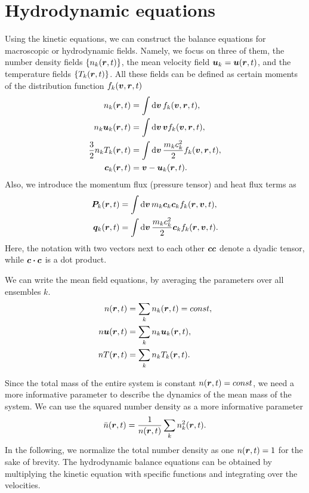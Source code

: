 \documentclass[aps,prl,preprint,groupedaddress,10pt]{revtex4-2}
\begin{document}
\section{Hydrodynamic equations}
Using the kinetic equations, we can construct the balance equations for macroscopic or
hydrodynamic fields. Namely, we focus on three of them, the number density fields
$\Bqty{n_k\pqty{\br,t}}$, the mean velocity field $\bu_k=\bu\pqty{\br,t}$, and the temperature
fields $\Bqty{T_k\pqty{\br,t}}$. All these fields can be defined as certain moments of the
distribution function $f_k\pqty{\bv, \br,t}$
\begin{equation}
    \begin{split}
        n_k\pqty{\br,t} &= \int\dd{\bv} f_k\pqty{\bv,\br,t},\\
        n_k\bu_k\pqty{\br,t} &= \int\dd{\bv} \bv f_k\pqty{\bv,\br,t},\\
        \frac{3}{2}n_kT_k\pqty{\br,t} &= \int\dd{\bv}\frac{m_kc_k^2}{2}f_k\pqty{\bv,\br,t},\\
        \bc_k\pqty{\br,t} &= \bv - \bu_k\pqty{\br,t}.
    \end{split}
\end{equation}
Also, we introduce the momentum flux (pressure tensor) and heat flux terms as
\begin{equation}
    \begin{split}
        \bP_k\pqty{\br,t} &= \int\dd{\bv}m_k\bc_k\bc_kf_k\pqty{\br,\bv,t},\\
        \bq_k\pqty{\br,t} &= \int\dd{\bv}\frac{m_kc_k^2}{2}\bc_kf_k\pqty{\br,\bv,t}.
    \end{split}
\end{equation}
Here, the notation with two vectors next to each other $\vb*{c}\vb*{c}$ denote a dyadic tensor, while
$\bc\vdot\bc$ is a dot product.

We can write the mean field equations, by averaging the parameters over all ensembles $k$.
\begin{equation}
    \begin{split}
        n\pqty{\br,t} &= \sum_kn_k\pqty{\br,t}=const,\\
        n\bu\pqty{\br,t} &= \sum_kn_k\bu_k\pqty{\br,t},\\
        nT\pqty{\br,t} &= \sum_kn_kT_k\pqty{\br,t}.
    \end{split}
\end{equation}

Since the total mass of the entire system is constant $n\pqty{\br,t}=const$, we need a more
informative parameter to describe the dynamics of the mean mass of the system. We can use the
squared number density as a more informative parameter
\begin{equation}
    \bar{n}\pqty{\br,t}=\frac{1}{n\pqty{\br,t}}\sum_kn_k^2\pqty{\br,t}.
\end{equation}
In the following, we normalize the total number density as one $n\pqty{\br,t}=1$ for the sake
of brevity. The hydrodynamic balance equations can be obtained by multiplying the kinetic
equation with specific functions and integrating over the velocities.
\end{document}
